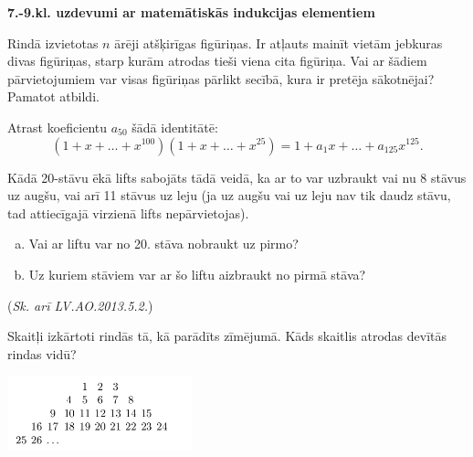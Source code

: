 \documentclass[11pt]{article}
\begin{document}
\begin{center}
{\Large \bf 7.-9.kl. uzdevumi ar matemātiskās indukcijas elementiem}
\end{center}

\begin{problem}[EE.PK.1993.9.5]
Rindā izvietotas $n$ ārēji atšķirīgas figūriņas. 
Ir atļauts mainīt vietām jebkuras divas figūriņas, 
starp kurām atrodas tieši viena cita figūriņa. 
Vai ar šādiem pārvietojumiem var visas figūriņas pārlikt
secībā, kura ir pretēja sākotnējai? Pamatot atbildi. 
\end{problem}



\begin{problem}[EE.PK.1994.9.1]
Atrast koeficientu $a_{50}$ šādā identitātē:
$$\left( 1 + x + \ldots + x^{100} \right) \left( 1 + x + \ldots + x^{25} \right)
= 1 + a_1x + \ldots + a_{125}x^{125}.$$
\end{problem}




\begin{problem}[EE.PK.1995.7.3]
Kādā 20-stāvu ēkā lifts sabojāts tādā veidā, ka ar to var 
uzbraukt vai nu 8 stāvus uz augšu, vai arī 11 stāvus uz leju
(ja uz augšu vai uz leju nav tik daudz stāvu, tad attiecīgajā virzienā 
lifts nepārvietojas). 
\begin{enumerate}[(a)]
\item Vai ar liftu var no 20. stāva nobraukt uz pirmo?
\item Uz kuriem stāviem var ar šo liftu aizbraukt no pirmā stāva?
\end{enumerate}
({\em Sk. arī LV.AO.2013.5.2.})
\end{problem}


\begin{problem}[EE.PK.1998.7.TEST.5]
Skaitļi izkārtoti rindās tā, kā parādīts zīmējumā. 
Kāds skaitlis atrodas devītās rindas vidū?
\begin{center}
\includegraphics[width=0.4\textwidth]{math-induction-junior-classes/EE-PK-1998-7-TEST-4.png}
\end{center}
\end{problem}
\end{document}
